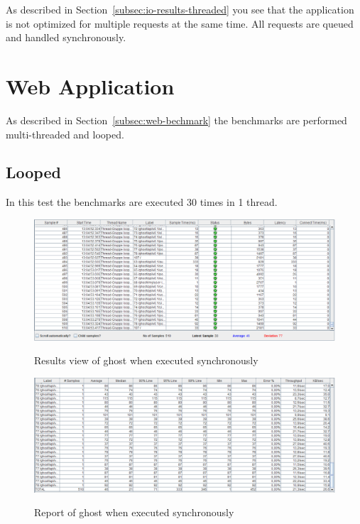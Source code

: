 As described in Section~\ref{subsec:io-results-threaded} you see that the application is not optimized for multiple requests at the same time. All requests are queued and handled synchronously.

\section{Web Application}
As described in Section~\ref{subsec:web-bechmark} the benchmarks are performed multi-threaded and looped.

\subsection{Looped}
In this test the benchmarks are executed 30 times in 1 thread. 

\begin{figure}[!h]
  \caption{Results view of ghost when executed synchronously}
  \centering
    \includegraphics[width=1\textwidth]{Screenshots/web-results-looped}
    \label{fig:web-results-looped}
\end{figure}

\begin{figure}[!h]
  \caption{Report of ghost when executed synchronously}
  \centering
    \includegraphics[width=1\textwidth]{Screenshots/web-report-looped}
	\label{fig:web-report-looped}
\end{figure}

